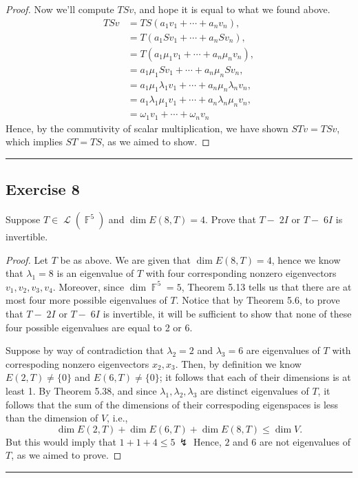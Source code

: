 \documentclass[letterpaper, 12pt]{amsart}
\DeclareMathOperator{\F}{\mathbb{F}}				%
\DeclareMathOperator{\Ell}{\mathscr{L}}				%
\theoremstyle{definition}  							%
\begin{document}
\begin{proof}
		Now we'll compute $TSv$, and hope it is equal to what we found above.
			\begin{align*}
				TSv &= TS(a_{1}v_{1} + \cdots + a_{n}v_{n}), \\
				&= T ( a_{1}Sv_{1} + \cdots + a_{n}Sv_{n} ), \\
				&= T ( a_{1}\mu_{1}v_{1} + \cdots + a_{n}\mu_{n}v_{n} ), \\
				&= a_{1}\mu_{1}Sv_{1} + \cdots + a_{n}\mu_{n}Sv_{n}, \\
				&= a_{1}\mu_{1}\lambda_{1}v_{1} + \cdots + a_{n}\mu_{n}\lambda_{n}v_{n}, \\
				&= a_{1}\lambda_{1}\mu_{1}v_{1} + \cdots + a_{n}\lambda_{n}\mu_{n}v_{n}, \\
				&= \omega_{1}v_{1} + \cdots + \omega_{n}v_{n}
			\end{align*}
		Hence, by the commutivity of scalar multiplication, we have shown $STv = TSv$, which implies $ST = TS$, as we aimed to show.
		\end{proof}
		\vspace*{2mm}
		\hrule
		\vspace*{2mm}

		\subsection*{Exercise 8}
		Suppose $T \in \Ell(\F^{5})$ and $\dim{E(8, T)} = 4$.
		Prove that $T-􏰋2I$ or $T-􏰋6I$ is invertible.
		\vspace*{3mm}

		\begin{proof}
		Let $T$ be as above.
		We are given that $\dim{E(8, T)} = 4$, hence we know that $\lambda_{1} = 8$ is an eigenvalue of $T$ with four corresponding nonzero eigenvectors $v_{1}, v_{2}, v_{3}, v_{4}$.
		Moreover, since $\dim \F^{5} = 5$, Theorem 5.13 tells us that there are at most four more possible eigenvalues of $T$.
		Notice that by Theorem 5.6, to prove that $T-􏰋2I$ or $T-􏰋6I$ is invertible, it will be sufficient to show that none of these four possible eigenvalues are equal to 2 or 6.

		Suppose by way of contradiction that $\lambda_{2} = 2$ and $\lambda_{3} = 6$ are eigenvalues of $T$ with correspoding nonzero eigenvectors $x_{2}, x_{3}$.
		Then, by definition we know $E(2,T) \neq \{ 0 \}$ and $E(6,T) \neq \{ 0 \}$; it follows that each of their dimensions is at least 1.
		By Theorem 5.38, and since $\lambda_{1}, \lambda_{2}, \lambda_{3}$ are distinct eigenvalues of $T$, it follows that the sum of the dimensions of their correspoding eigenspaces is less than the dimension of $V$, i.e., $$\dim{E(2,T)} + \dim{E(6,T)} + \dim{E(8,T)} \leq \dim{V}.$$
		But this would imply that $1 + 1 + 4 \leq 5 \, \lightning$
		Hence, $2$ and $6$ are not eigenvalues of $T$, as we aimed to prove. 
		\end{proof}
		\vspace*{2mm}
		\hrule
		\vspace*{2mm}
\end{document}
